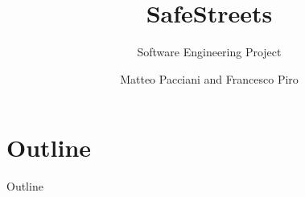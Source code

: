 

\title{\huge \textbf{SafeStreets}}
\subtitle{Software Engineering  Project}



\author{Matteo Pacciani and Francesco Piro}


	
{
	\frame{\titlepage}
}

\section*{Outline}
	\begin{frame}{Outline}
		\textbf{\tableofcontents}
	\end{frame}

\clearpage


\clearpage





